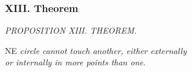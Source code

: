 \documentclass[12pt,preview]{standalone}
\begin{document}
\subsubsection{XIII. Theorem}

\begin{minipage}[t]{0.33\textwidth}
    \phantom{}
\end{minipage}%
\hfill
\begin{minipage}[t]{0.64\textwidth}

    \begin{center}
        \textit{PROPOSITION XIII. THEOREM.}\label{book3pr13} \\
    \end{center}

    \hfill

    \begin{center}
        \raggedright \lettrine[lines=4, loversize=1, nindent=0pt]{}{}NE \textit{circle cannot touch another, either externally\\ or internally in more points than one}.
    \end{center}
\end{minipage}%

\hfill
\end{document}
